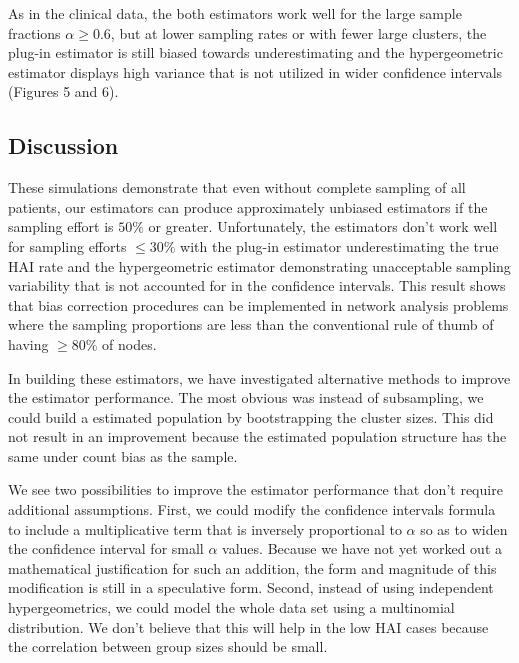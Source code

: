 \documentclass[]{article}
\begin{document}
As in the clinical data, the both estimators work well for the large
sample fractions \(\alpha \ge 0.6\), but at lower sampling rates or with
fewer large clusters, the plug-in estimator is still biased towards
underestimating and the hypergeometric estimator displays high variance
that is not utilized in wider confidence intervals (Figures 5 and 6).

\hypertarget{discussion}{%
\subsection{Discussion}\label{discussion}}

These simulations demonstrate that even without complete sampling of all
patients, our estimators can produce approximately unbiased estimators
if the sampling effort is \(50\%\) or greater. Unfortunately, the
estimators don't work well for sampling efforts \(\le 30\%\) with the
plug-in estimator underestimating the true HAI rate and the
hypergeometric estimator demonstrating unacceptable sampling variability
that is not accounted for in the confidence intervals. This result shows
that bias correction procedures can be implemented in network analysis
problems where the sampling proportions are less than the conventional
rule of thumb of having \(\ge 80\%\) of nodes.

In building these estimators, we have investigated alternative methods
to improve the estimator performance. The most obvious was instead of
subsampling, we could build a estimated population by bootstrapping the
cluster sizes. This did not result in an improvement because the
estimated population structure has the same under count bias as the
sample.

We see two possibilities to improve the estimator performance that don't
require additional assumptions. First, we could modify the confidence
intervals formula to include a multiplicative term that is inversely
proportional to \(\alpha\) so as to widen the confidence interval for
small \(\alpha\) values. Because we have not yet worked out a
mathematical justification for such an addition, the form and magnitude
of this modification is still in a speculative form. Second, instead of
using independent hypergeometrics, we could model the whole data set
using a multinomial distribution. We don't believe that this will help
in the low HAI cases because the correlation between group sizes should
be small.
\end{document}
